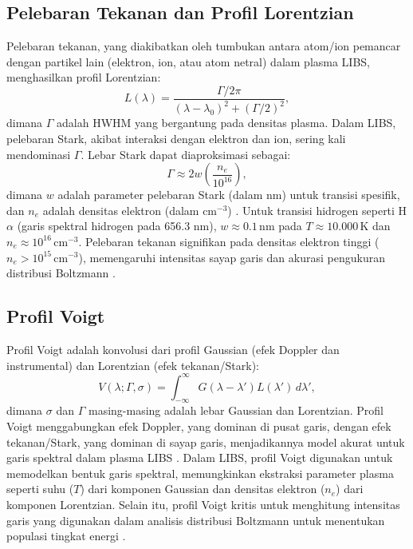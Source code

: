 \subsection{Pelebaran Tekanan dan Profil Lorentzian}
Pelebaran tekanan, yang diakibatkan oleh tumbukan antara atom/ion pemancar dengan partikel lain (elektron, ion, atau atom netral) dalam plasma LIBS, menghasilkan profil Lorentzian:
\begin{equation}
L(\lambda) = \frac{\Gamma / 2\pi}{(\lambda - \lambda_0)^2 + (\Gamma / 2)^2}, \label{eq:bab2_eq31}
\end{equation}
dimana \( \Gamma \) adalah HWHM yang bergantung pada densitas plasma. Dalam LIBS, pelebaran Stark, akibat interaksi dengan elektron dan ion, sering kali mendominasi \( \Gamma \). Lebar Stark dapat diaproksimasi sebagai:
\begin{equation}
\Gamma \approx 2w \left( \frac{n_e}{10^{16}} \right), \label{eq:bab2_eq32}
\end{equation}
dimana \( w \) adalah parameter pelebaran Stark (dalam nm) untuk transisi spesifik, dan \( n_e \) adalah densitas elektron (dalam \( \text{cm}^{-3} \)) \citep{Griem1997,Konjevic1999}. Untuk transisi hidrogen seperti H\(\alpha\) (garis spektral hidrogen pada 656.3 nm), \( w \approx 0.1 \, \text{nm} \) pada \( T \approx 10.000 \, \text{K} \) dan \( n_e \approx 10^{16} \, \text{cm}^{-3} \). Pelebaran tekanan signifikan pada densitas elektron tinggi (\( n_e > 10^{15} \, \text{cm}^{-3} \)), memengaruhi intensitas sayap garis dan akurasi pengukuran distribusi Boltzmann \citep{Aragon2008}.

\subsection{Profil Voigt}
Profil Voigt adalah konvolusi dari profil Gaussian (efek Doppler dan instrumental) dan Lorentzian (efek tekanan/Stark):
\begin{equation}
V(\lambda; \Gamma, \sigma) = \int_{-\infty}^{\infty} G(\lambda - \lambda') L(\lambda') \, d\lambda', \label{eq:bab2_eq33}
\end{equation}
dimana \( \sigma \) dan \( \Gamma \) masing-masing adalah lebar Gaussian dan Lorentzian. Profil Voigt menggabungkan efek Doppler, yang dominan di pusat garis, dengan efek tekanan/Stark, yang dominan di sayap garis, menjadikannya model akurat untuk garis spektral dalam plasma LIBS \citep{Griem1997}. Dalam  LIBS, profil Voigt digunakan untuk memodelkan bentuk garis spektral, memungkinkan ekstraksi parameter plasma seperti suhu (\( T \)) dari komponen Gaussian dan densitas elektron (\( n_e \)) dari komponen Lorentzian. Selain itu, profil Voigt kritis untuk menghitung intensitas garis yang digunakan dalam analisis distribusi Boltzmann untuk menentukan populasi tingkat energi \citep{Miziolek2006,Aragon2008}.

